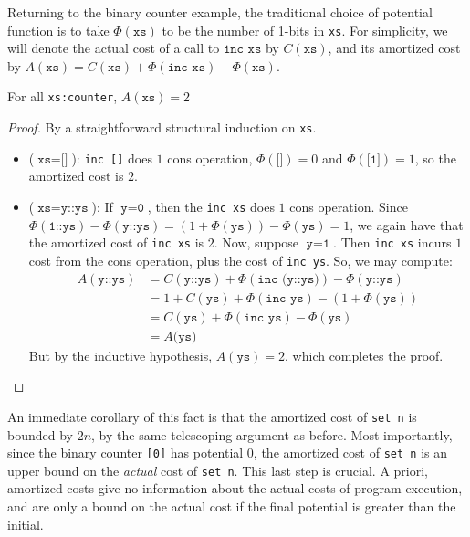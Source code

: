 Returning to the binary counter example, the traditional choice of potential function is to take $\Phi(\texttt{xs})$ to be the number of 1-bits in \texttt{xs}.
For simplicity, we will denote the actual cost of a call to $\texttt{inc xs}$ by $C(\texttt{xs})$, and its amortized cost by $A(\texttt{xs}) = C(\texttt{xs}) + \Phi(\texttt{inc xs}) - \Phi(\texttt{xs})$.

\begin{theorem}
For all \texttt{xs:counter}, $A(\texttt{xs}) = 2$
\end{theorem}
\label{thm:bc-phys}
\begin{proof}
By a straightforward structural induction on \texttt{xs}.
\begin{itemize}
  \item ($\texttt{xs} = \texttt{[]}$): \texttt{inc []} does $1$ cons operation, $\Phi(\texttt{[]}) = 0$ and $\Phi(\texttt{[1]}) = 1$, so the amortized cost is $2$.
  \item ($\texttt{xs} = \texttt{y::ys}$): If $\texttt{y} = \texttt{0}$, then the \texttt{inc xs} does $1$ cons operation. Since $\Phi(\texttt{1::ys}) - \Phi(\texttt{y::ys}) = (1 + \Phi(\texttt{ys})) - \Phi(\texttt{ys}) = 1$, we again have that the amortized cost of \texttt{inc xs} is $2$. Now, suppose $\texttt{y} = \texttt{1}$. Then \texttt{inc xs} incurs $1$ cost from the cons operation, plus the cost of \texttt{inc ys}. So, we may compute:
  \begin{align*}
    A(\texttt{y::ys}) &= C(\texttt{y::ys}) + \Phi(\texttt{inc (y::ys)}) - \Phi(\texttt{y::ys})\\
    &= 1 + C(\texttt{ys}) + \Phi(\texttt{inc ys}) - (1 + \Phi(\texttt{ys}))\\
    &= C(\texttt{ys}) + \Phi(\texttt{inc ys}) - \Phi(\texttt{ys})\\
    &= A(\texttt{ys)}
  \end{align*}
  But by the inductive hypothesis, $A(\texttt{ys}) = 2$, which completes the proof.
\end{itemize}
\end{proof}

An immediate corollary of this fact is that the amortized cost of \texttt{set n} is bounded by $2n$, by the same telescoping argument as before. Most importantly, since the binary counter \texttt{[0]} has potential $0$, the amortized cost of \texttt{set n} is an upper bound on the \textit{actual} cost of \texttt{set n}. This last step is crucial. A priori, amortized costs give no information about the actual costs of program execution, and are only a bound on the actual cost if the final potential is greater than the initial.


